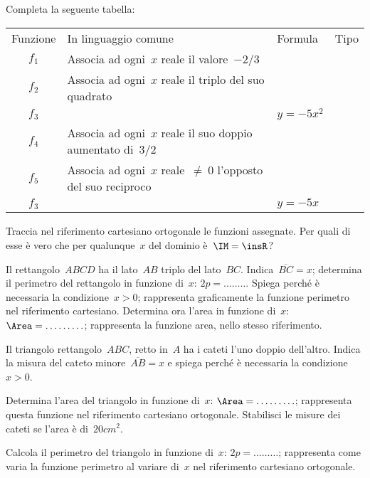 \begin{esercizio}
\label{ese:8.59}
Completa la seguente tabella:
\begin{center}
 \begin{tabular}{clll}
  \toprule
  Funzione&In linguaggio comune&Formula&Tipo\\
  $f_1$&Associa ad ogni~$x$ reale il valore~$-2/3$& &\\
  $f_2$&Associa ad ogni~$x$ reale il triplo del suo quadrato& & \\
  $f_3$& &$y=-5x^2$& \\
  $f_4$&Associa ad ogni~$x$ reale il suo doppio aumentato di~$3/2$& & \\
  $f_5$&Associa ad ogni~$x$ reale~$\neq~0$ l'opposto del suo reciproco& & \\
  $f_3$& &$y=-5x$& \\
  \bottomrule
 \end{tabular}
\end{center}
Traccia nel riferimento cartesiano ortogonale le funzioni assegnate. Per quali di esse è vero che per qualunque~$x$ del dominio è~$\IM=\insR$?
\end{esercizio}

\begin{esercizio}
\label{ese:8.60}
Il rettangolo~${ABCD}$ ha il lato~${AB}$ triplo del lato~${BC}$. Indica~$\overline{BC}=x$; determina il perimetro del
rettangolo in funzione di~$x$: $2p=\ldots \ldots \ldots$
Spiega perché è necessaria la condizione~$x>0$; rappresenta graficamente la funzione perimetro nel riferimento cartesiano.
Determina ora l'area in funzione di~$x$: $\Area=\ldots \ldots \ldots$; rappresenta la funzione area, nello stesso riferimento.
\end{esercizio}

\begin{esercizio}
\label{ese:8.61}
Il triangolo rettangolo~${ABC}$, retto in~$A$ ha i cateti l'uno doppio dell'altro. Indica la misura del cateto minore~$\overline{AB}=x$
e spiega perché è necessaria la condizione~$x>0$.

Determina l'area del triangolo in funzione di~$x$: $\Area=\ldots \ldots \ldots$;
rappresenta questa funzione nel riferimento cartesiano ortogonale.
Stabilisci le misure dei cateti se l'area è di~$20\unit{cm^2}$.

Calcola il perimetro del triangolo in funzione di~$x$: $2p=\ldots \ldots \ldots$; rappresenta come varia la funzione perimetro al variare di~$x$ nel riferimento cartesiano ortogonale.
\end{esercizio}

